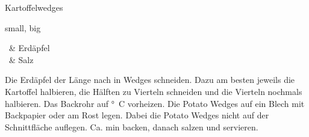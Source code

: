 \begin{recipe}
[
    preparationtime,
    bakingtime,
    bakingtemperature = 210 \degree C,
    portion,
    calory,
    source,
]
{Kartoffelwedges}
    
    \graph
    {
        small,
        big
    }
    
    \ingredients
    {
		\ & Erdäpfel \\ \hline
		\ & Salz
    }
    
    \preparation
    {
        \step Die Erdäpfel der Länge nach in Wedges schneiden.
        \step Dazu am besten jeweils die Kartoffel halbieren, die Hälften zu Vierteln schneiden und die Vierteln nochmals 	halbieren.
        \step Das Backrohr auf \unit[210]{\degree C} vorheizen.
        \step Die Potato Wedges auf ein Blech mit Backpapier oder am Rost legen.
        \step Dabei die Potato Wedges nicht auf der Schnittfläche auflegen.
        \step Ca. \unit[20]{min} backen, danach salzen und servieren.
	}
\end{recipe}